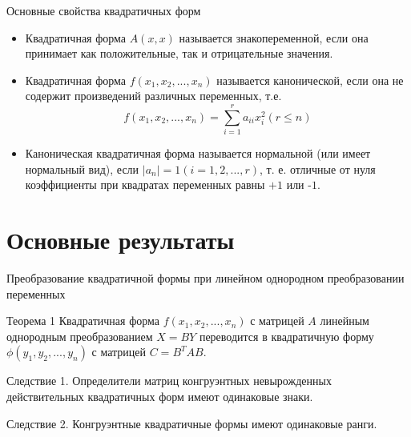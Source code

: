 \documentclass[10pt,pdf,hyperref={unicode}]{beamer}
\begin{document}
\begin{frame}{Основные свойства квадратичных форм}

\begin{block}

\begin{itemize}

\item{Квадратичная форма $A(x,x)$ называется знакопеременной, если она принимает как положительные, так и отрицательные значения.}
\item{Квадратичная форма $f(x_1,x_2,...,x_n)$ называется канонической, если она не содержит произведений различных переменных, т.е. $$f(x_1,x_2,...,x_n)=\sum_{i=1}^{r}{a_{ii}x_i^2} (r \le n)$$}
\item{Каноническая квадратичная форма называется нормальной (или имеет нормальный вид), если $|a_n| = 1 ( i= 1, 2, . . . , r)$, т. е. отличные от нуля коэффициенты при квадратах переменных равны $+1$ или -$1$. }

\end{itemize}

\end{block}

\end{frame}

\section{Основные результаты}
\begin{frame}{Преобразование квадратичной формы при линейном однородном
преобразовании переменных}

\begin{block}{Теорема 1}
Квадратичная форма $f(x_1, x_2,...,x_n)$ с матрицей $A$ линейным однородным преобразованием $X = BY$ переводится в квадратичную форму $\phi(y_1, y_2,...,y_n)$ с матрицей $C=B^{T}AB$.
\end{block}

\begin{block}{Следствие 1.} 
Определители матриц конгруэнтных невырожденных действительных квадратичных форм имеют одинаковые знаки.
\end{block}

\begin{block}{Следствие 2.} 
Конгруэнтные квадратичные формы имеют одинаковые ранги.
\end{block}

\end{frame} 
\end{document}
